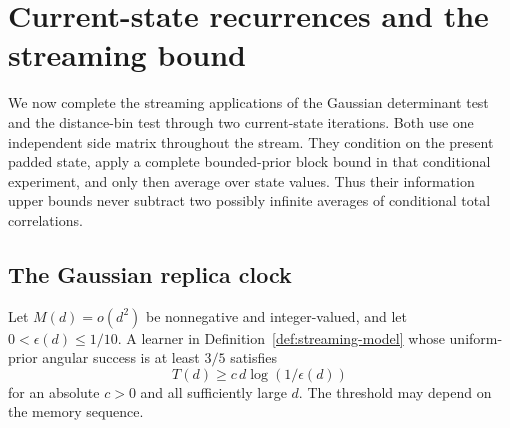 \section{Current-state recurrences and the streaming bound}
\label{sec:streaming-consequences}

We now complete the streaming applications of the Gaussian determinant
test and the distance-bin test through two current-state iterations.
Both use one independent side matrix throughout the stream. They condition
on the present padded state, apply a complete bounded-prior block bound in
that conditional experiment, and only then average over state values.
Thus their information upper bounds never subtract two possibly infinite
averages of conditional total correlations.

\subsection{The Gaussian replica clock}

\begin{proposition}
\label{prop:gaussian-streaming}
Let $M(d)=o(d^2)$ be nonnegative and integer-valued, and let
$0<\epsilon(d)\le1/10$. A learner in
Definition~\ref{def:streaming-model} whose uniform-prior angular success is
at least $3/5$ satisfies
\[
 T(d)\ge c\,d\log(1/\epsilon(d))
\]
for an absolute $c>0$ and all sufficiently large $d$. The threshold may
depend on the memory sequence.
\end{proposition}

